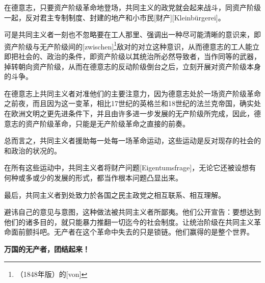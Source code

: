 \documentclass[a4paper,12pt]{ctexart}
\begin{document}
在德意志，只要资产阶级革命地登场，共同主义的政党就会起来战斗，同资产阶级一起，反对君主专制制度、封建的地产和小市民[财产][Kleinbürgerei]。


可是共同主义者一刻也不忽略要在工人那里、强调出一种尽可能清晰的意识来，即资产阶级与无产阶级间的[zwischen]\footnote{（1848年版）的[von]}敌对的对立这种意识，从而德意志的工人能立即把社会的、政治的条件，即资产阶级以其统治所必然导致者，当作同等的武器，掉转朝向资产阶级，从而在德意志的反动阶级倒台之后，立刻开展对资产阶级本身的斗争。

在德意志上共同主义者对准他们的主要注意力，因为德意志处於一场资产阶级革命之前夜，而且因为这一变革，相比17世纪的英格兰和18世纪的法兰克帝国，确实处在欧洲文明之更先进条件下，并且由许多进一步发展的无产阶级所完成，因此，德意志的资产阶级革命，只能是无产阶级革命之直接的前奏。

总而言之，共同主义者援助每一处每一场革命运动，这些运动是反对现存的社会的和政治的状况的。

在所有这些运动中，共同主义者将财产问题[Eigentumsfrage]，无论它还被设想有何种或多或少的发展的形式，都当作根本问题凸显出来。

最后，共同主义者到处致力於各国之民主政党之相互联系、相互理解。

避讳自己的意见与意图，这种做法被共同主义者所鄙夷。他们公开宣告：要想达到他们的诸多目的，就只能暴力推翻一切迄今的社会制度。让统治阶级在共同主义革命面前颤抖吧。无产者在这个革命中失去的只是锁链。他们赢得的是整个世界。

\begin{center}
\vspace*{2em}
\textbf{\large 万国的无产者，团结起来！}
\end{center}


\newpage
\theendnotes
{}
\end{document}
